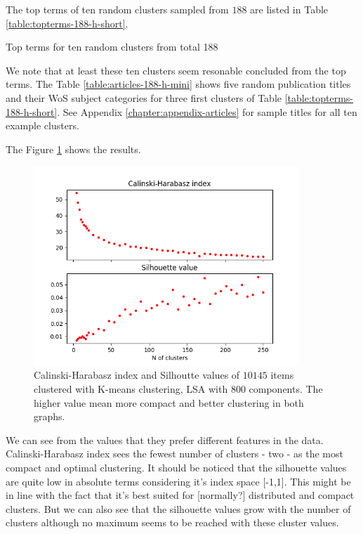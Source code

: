 The top terms of ten random clusters sampled from $188$ are listed
in Table \ref{table:topterms-188-h-short}.
\begin{table}[ht]
  \begin{center}
    
    \caption{Top terms for ten random clusters from total 188}
    \label{table:topterms-188-h-short}    
 \end{center}
\end{table}
We note that at least these ten clusters seem resonable concluded
from the top terms. The Table \ref{table:articles-188-h-mini} 
shows five random publication titles and their WoS subject 
categories for three first clusters of Table \ref{table:topterms-188-h-short}. 
See Appendix \ref{chapter:appendix-articles} for sample titles for
all ten example clusters.
\newpage



The Figure \ref{fig:ch-silh-full-h} shows the results.
\begin{figure}[ht]
  \begin{center}    
\includegraphics[width=10cm]{images/c-h-silh-index-plot-y2000-2_260-800-kmeans.png}
  \caption{Calinski-Harabasz index and Silhoutte values of $10145$
  items clustered with K-means clustering, LSA with 800 components. 
  The higher value mean more compact and better clustering in both graphs.}
    \label{fig:ch-silh-full-h}
  \end{center}
\end{figure}

We can see from the values that they prefer different features in
the data. Calinski-Harabasz index sees the fewest number of 
clusters - two - as the most compact and optimal clustering. 
It should be noticed that the silhouette values are quite low 
in absolute terms considering it's index space [-1,1]. This might 
be in line with the fact that it's best suited for [normally?] 
distributed and compact clusters. But we can also see that the 
silhouette values grow with the number of clusters although no
maximum seems to be reached with these cluster values.


